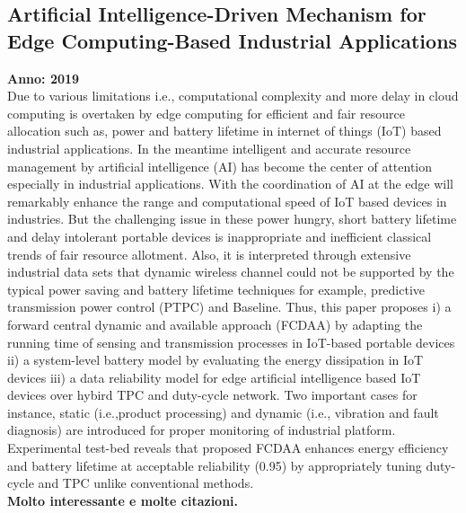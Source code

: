 \subsection{Artificial Intelligence-Driven Mechanism for Edge Computing-Based Industrial Applications}
\textbf{Anno: 2019}~\cite{sodhro2019artificial}\\
Due to various limitations i.e., computational complexity and more delay in cloud computing is overtaken by edge
computing for efficient and fair resource allocation such as, power and battery lifetime in internet of things (IoT) based industrial
applications. In the meantime intelligent and accurate resource management by artificial intelligence (AI) has become the center of
attention especially in industrial applications. With the coordination of AI at the edge will remarkably enhance the range and
computational speed of IoT based devices in industries. But the challenging issue in these power hungry, short battery lifetime and
delay intolerant portable devices is inappropriate and inefficient classical trends of fair resource allotment. Also, it is interpreted
through extensive industrial data sets that dynamic wireless channel could not be supported by the typical power saving and
battery lifetime techniques for example, predictive transmission power control (PTPC) and Baseline. Thus, this paper proposes i) a
forward central dynamic and available approach (FCDAA) by adapting the running time of sensing and transmission processes in
IoT-based portable devices ii) a system-level battery model by evaluating the energy dissipation in IoT devices iii) a data reliability
model for edge artificial intelligence based IoT devices over hybird TPC and duty-cycle network. Two important cases for instance,
static (i.e.,product processing) and dynamic (i.e., vibration and fault diagnosis) are introduced for proper monitoring of industrial
platform. Experimental test-bed reveals that proposed FCDAA enhances energy efficiency and battery lifetime at acceptable
reliability (0.95) by appropriately tuning duty-cycle and TPC unlike conventional methods.\\

\textbf{Molto interessante e molte citazioni.}


